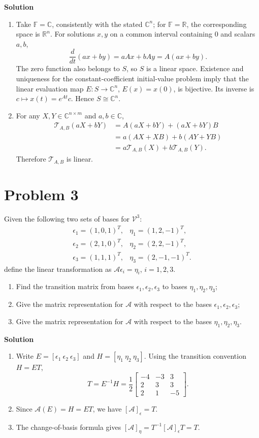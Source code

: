 \documentclass[UTF8,10pt,letterpaper,fontset=fandol]{ctexart}
\newcommand{\R}{\mathbb R}
\newcommand{\C}{\mathbb C}
\newcommand{\F}{\mathbb F}
\newcommand{\Solution}{\par\Needspace{5\baselineskip}\textbf{Solution}\par}
\begin{document}
\Solution
\begin{enumerate}
\item Take \(\F=\C\), consistently with the stated \(\C^n\); for \(\F=\R\), the corresponding
space is \(\R^n\). For solutions \(x,y\) on a common interval containing \(0\) and scalars \(a,b\),
\[
\frac{d}{dt}(ax+by)=aAx+bAy=A(ax+by).
\]
The zero function also belongs to \(S\), so \(S\) is a linear space.
Existence and uniqueness for the constant-coefficient initial-value problem imply that
the linear evaluation map \(E:S\to\C^n\), \(E(x)=x(0)\), is bijective.
Its inverse is \(c\mapsto x(t)=e^{At}c\). Hence \(\boxed{S\cong\C^n}\).
\item For any \(X,Y\in\C^{n\times m}\) and \(a,b\in\C\),
\[
\begin{aligned}
\mathcal T_{A,B}(aX+bY)
&=A(aX+bY)+(aX+bY)B\\
&=a(AX+XB)+b(AY+YB)\\
&=a\mathcal T_{A,B}(X)+b\mathcal T_{A,B}(Y).
\end{aligned}
\]
Therefore \(\mathcal T_{A,B}\) is linear.
\end{enumerate}

\section{Problem 3}
Given the following two sets of bases for \(\mathcal V^3\):
\[
\begin{array}{ll}
\epsilon_1=(1,0,1)^T,&\eta_1=(1,2,-1)^T,\\
\epsilon_2=(2,1,0)^T,&\eta_2=(2,2,-1)^T,\\
\epsilon_3=(1,1,1)^T,&\eta_3=(2,-1,-1)^T.
\end{array}
\]
define the linear transformation as \(\mathcal A\epsilon_i=\eta_i\), \(i=1,2,3\).
\begin{enumerate}
\item Find the transition matrix from bases \(\epsilon_1,\epsilon_2,\epsilon_3\)
to bases \(\eta_1,\eta_2,\eta_3\);
\item Give the matrix representation for \(\mathcal A\) with respect to the bases
\(\epsilon_1,\epsilon_2,\epsilon_3\);
\item Give the matrix representation for \(\mathcal A\) with respect to the bases
\(\eta_1,\eta_2,\eta_3\).
\end{enumerate}

\Solution
\begin{enumerate}
\item Write \(E=[\epsilon_1\ \epsilon_2\ \epsilon_3]\) and
\(H=[\eta_1\ \eta_2\ \eta_3]\). Using the transition convention \(H=ET\),
\[
\boxed{T=E^{-1}H=\frac12\begin{bmatrix}-4&-3&3\\2&3&3\\2&1&-5\end{bmatrix}}.
\]
\item Since \(\mathcal A(E)=H=ET\), we have \(\boxed{[\mathcal A]_{\epsilon}=T}\).
\item The change-of-basis formula gives
\(\boxed{[\mathcal A]_{\eta}=T^{-1}[\mathcal A]_{\epsilon}T=T}\).
\end{enumerate}
\end{document}

